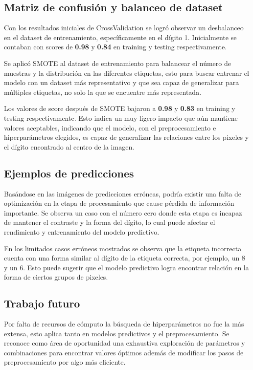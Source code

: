 \documentclass[journal]{IEEEtran}
\begin{document}
\subsection{Matriz de confusión y balanceo de dataset}
Con los resultados iniciales de CrossValidation se logró observar un desbalanceo en el dataset de entrenamiento, específicamente en el dígito 1. Inicialmente se contaban con scores de \textbf{0.98} y \textbf{0.84} en training y testing respectivamente.

Se aplicó SMOTE al dataset de entrenamiento para balancear el número de muestras y la distribución en las diferentes etiquetas, esto para buscar entrenar el modelo con un dataset más representativo y que sea capaz de generalizar para múltiples etiquetas, no solo la que se encuentre más representada.

Los valores de score después de SMOTE bajaron a \textbf{0.98} y \textbf{0.83} en training y testing respectivamente. Esto indica un muy ligero impacto que aún mantiene valores aceptables, indicando que el modelo, con el preprocesamiento e hiperparámetros elegidos, es capaz de generalizar las relaciones entre los pixeles y el dígito encontrado al centro de la imagen.

\subsection{Ejemplos de predicciones}
Basándose en las imágenes de predicciones erróneas, podría existir una falta de optimización en la etapa de procesamiento que cause pérdida de información importante. Se observa un caso con el número cero donde esta etapa es incapaz de mantener el contraste y la forma del dígito, lo cual puede afectar el rendimiento y entrenamiento del modelo predictivo.

En los limitados casos erróneos mostrados se observa que la etiqueta incorrecta cuenta con una forma similar al dígito de la etiqueta correcta, por ejemplo, un 8 y un 6. Esto puede sugerir que el modelo predictivo logra encontrar relación en la forma de ciertos grupos de pixeles.

\subsection{Trabajo futuro}
Por falta de recursos de cómputo la búsqueda de hiperparámetros no fue la más extensa, esto aplica tanto en modelos predictivos y el preprocesamiento. Se reconoce como área de oportunidad una exhaustiva exploración de parámetros y combinaciones para encontrar valores óptimos además de modificar los pasos de preprocesamiento por algo más eficiente.
\end{document}
